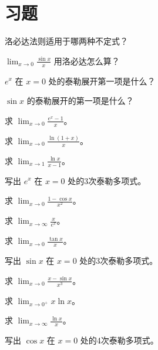 \section{习题}
\begin{exercise}[0] 洛必达法则适用于哪两种不定式？\end{exercise}
\begin{exercise}[0] \(\lim_{x\to0}\frac{\sin x}{x}\) 用洛必达怎么算？\end{exercise}
\begin{exercise}[0] \(e^x\) 在 \(x=0\) 处的泰勒展开第一项是什么？\end{exercise}
\begin{exercise}[0] \(\sin x\) 的泰勒展开的第一项是什么？\end{exercise}
\begin{exercise}[1] 求 \(\lim_{x\to0}\frac{e^x-1}{x}\)。\end{exercise}
\begin{exercise}[1] 求 \(\lim_{x\to0}\frac{\ln(1+x)}{x}\)。\end{exercise}
\begin{exercise}[1] 求 \(\lim_{x\to1}\frac{\ln x}{x-1}\)。\end{exercise}
\begin{exercise}[1] 写出 \(e^x\) 在 \(x=0\) 处的3次泰勒多项式。\end{exercise}
\begin{exercise}[2] 求 \(\lim_{x\to0}\frac{1-\cos x}{x^2}\)。\end{exercise}
\begin{exercise}[2] 求 \(\lim_{x\to\infty}\frac{x}{e^x}\)。\end{exercise}
\begin{exercise}[2] 求 \(\lim_{x\to0}\frac{\tan x}{x}\)。\end{exercise}
\begin{exercise}[2] 写出 \(\sin x\) 在 \(x=0\) 处的3次泰勒多项式。\end{exercise}
\begin{exercise}[3] 求 \(\lim_{x\to0}\frac{x-\sin x}{x^3}\)。\end{exercise}
\begin{exercise}[3] 求 \(\lim_{x\to0^+} x\ln x\)。\end{exercise}
\begin{exercise}[3] 求 \(\lim_{x\to\infty}\frac{\ln x}{x}\)。\end{exercise}
\begin{exercise}[3] 写出 \(\cos x\) 在 \(x=0\) 处的4次泰勒多项式。\end{exercise}
